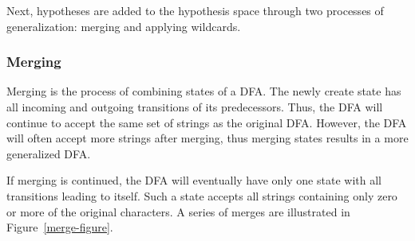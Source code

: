 \documentclass[10pt,letterpaper]{article}
\begin{document}
Next, hypotheses are added to the hypothesis space through two processes of generalization: merging and applying wildcards.
 

\subsubsection{Merging} Merging is the process of combining states of a DFA. The newly create state has all incoming and outgoing transitions of its predecessors. Thus, the DFA will continue to accept the same set of strings as the original DFA. However, the DFA will often accept more strings after merging, thus merging states results in a more generalized DFA.

If merging is continued, the DFA will eventually have only one state with all transitions leading to itself. Such a state accepts all strings containing only zero or more of the original characters. A series of merges are illustrated in Figure~\ref{merge-figure}.
\end{document}
